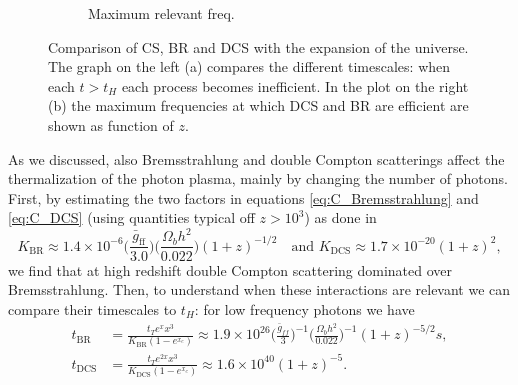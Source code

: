 \begin{figure}
\begin{subfigure}[b]{0.48\textwidth}
        \caption{Maximum relevant freq.}
        \label{fig:critical_frequencies}
    \end{subfigure}
    \caption{Comparison of CS, BR and DCS with the expansion of the universe. The graph on the left (a) compares the different timescales: when each $t>t_H$ each process becomes inefficient. In the plot on the right (b) the maximum frequencies at which DCS and BR are efficient are shown as function of $z$.}
\end{figure}
As we discussed, also Bremsstrahlung and double Compton scatterings affect the thermalization of the photon plasma, mainly by changing the number of photons. First, by estimating the two factors in equations \eqref{eq:C_Bremsstrahlung} and \eqref{eq:C_DCS} (using quantities typical off $z>10^3$) as done in \cite{chlubafuturestepscosmologyusing}
$$K_\text{BR}\approx1.4\times10^{-6}\bigg(\frac{\bar{g}_\text{ff}}{3.0}\bigg)\bigg(\frac{\Omega_b h^2}{0.022}\bigg)(1+z)^{-1/2}\quad\text{and }K_\text{DCS}\approx1.7\times10^{-20}(1+z)^2,$$ we find that at high redshift double Compton scattering dominated over Bremsstrahlung. Then, to understand when these interactions are relevant we can compare their timescales to $t_H$: for low frequency photons we have
\begin{align*}
    t_{\text{BR}}&=\frac{t_Te^{x}x^3}{K_\text{BR}(1-e^{x_e})}\approx1.9\times10^{26}\bigg(\frac{\bar{g}_{ff}}{3}\bigg)^{-1}\bigg(\frac{\Omega_bh^2}{0.022}\bigg)^{-1}(1+z)^{-5/2}s,\\
    t_{\text{DCS}}&=\frac{t_Te^{2x}x^3}{K_\text{DCS}(1-e^{x_e})}\approx1.6\times10^{40}(1+z)^{-5}.
\end{align*}

